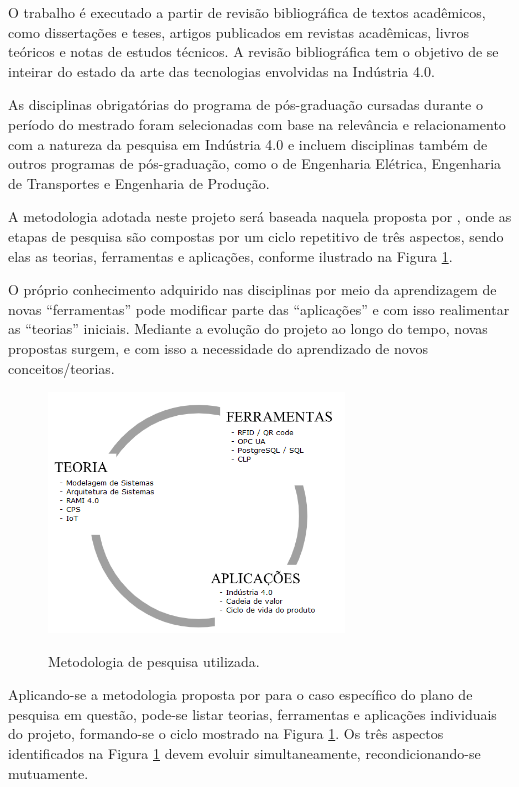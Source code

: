 \documentclass[
	12pt,				%
	oneside,			%
	a4paper,			%
	english,			%
	brazil				%
]{abntex2}
\begin{document}
	O trabalho é executado a partir de revisão bibliográfica de textos acadêmicos, como dissertações e teses, artigos publicados em revistas acadêmicas, livros teóricos e notas de estudos técnicos. A revisão bibliográfica tem o objetivo de se inteirar do estado da arte das tecnologias envolvidas na Indústria 4.0.
	
	As disciplinas obrigatórias do programa de pós-graduação cursadas durante o período do mestrado foram selecionadas com base na relevância e relacionamento com a natureza da pesquisa em Indústria 4.0 e incluem disciplinas também de outros programas de pós-graduação, como o de Engenharia Elétrica, Engenharia de Transportes e Engenharia de Produção.
	
	A metodologia adotada neste projeto será baseada naquela proposta por , onde as etapas de pesquisa são compostas por um ciclo repetitivo de três aspectos, sendo elas as teorias, ferramentas e aplicações, conforme ilustrado na Figura \ref{fig:metodologia-jensen}.
	
	O próprio conhecimento adquirido nas disciplinas por meio da aprendizagem de novas “ferramentas” pode modificar parte das “aplicações” e com isso realimentar as “teorias” iniciais. Mediante a evolução do projeto ao longo do tempo, novas propostas surgem, e com isso a necessidade do aprendizado de novos conceitos/teorias.

	\begin{figure}[H]
		\centering
		\caption{Metodologia de pesquisa utilizada.}
		\includegraphics[width=0.7\textwidth]{metodologia-jensen.png}
		\label{fig:metodologia-jensen}
	\end{figure}

	Aplicando-se a metodologia proposta por  para o caso específico do plano de pesquisa em questão, pode-se listar teorias, ferramentas e aplicações individuais do projeto, formando-se o ciclo mostrado na Figura \ref{fig:metodologia-jensen}. Os três aspectos identificados na Figura \ref{fig:metodologia-jensen} devem evoluir simultaneamente, recondicionando-se mutuamente.
\end{document}
